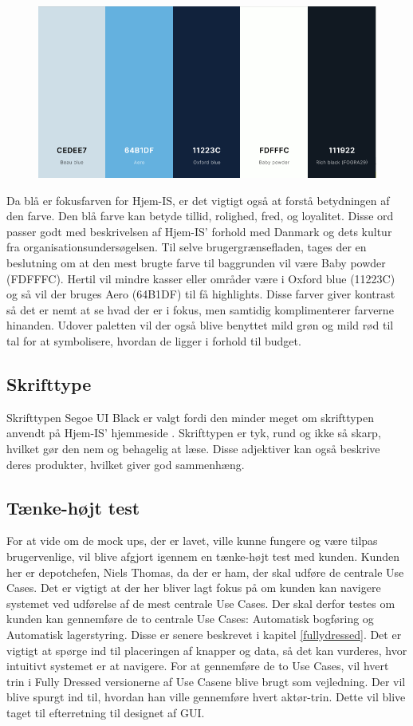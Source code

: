 \begin{figure}
    \centering
    \includegraphics[width=\textwidth]{figures/Preliminary/farvepalet.png}
    \label{fig:farvepalet}
\end{figure}
Da blå er fokusfarven for Hjem-IS, er det vigtigt også at forstå betydningen af den farve. Den blå farve kan betyde tillid, rolighed, fred, og loyalitet. Disse ord passer godt med beskrivelsen af Hjem-IS' forhold med Danmark og dets kultur fra organisationsundersøgelsen. Til selve brugergrænsefladen, tages der en beslutning om at den mest brugte farve til baggrunden vil være Baby powder (FDFFFC). Hertil vil mindre kasser eller områder være i Oxford blue (11223C) og så vil der bruges Aero (64B1DF) til få highlights. Disse farver giver kontrast så det er nemt at se hvad der er i fokus, men samtidig komplimenterer farverne hinanden. Udover paletten vil der også blive benyttet mild grøn og mild rød til tal for at symbolisere, hvordan de ligger i forhold til budget.

\subsection{Skrifttype}
Skrifttypen Segoe UI Black er valgt fordi den minder meget om skrifttypen anvendt på Hjem-IS' hjemmeside \cite{hjemis}. Skrifttypen er tyk, rund og ikke så skarp, hvilket gør den nem og behagelig at læse. Disse adjektiver kan også beskrive deres produkter, hvilket giver god sammenhæng.

\subsection{Tænke-højt test}
For at vide om de mock ups, der er lavet, ville kunne fungere og være tilpas brugervenlige, vil blive afgjort igennem en tænke-højt test med kunden. Kunden her er depotchefen, Niels Thomas, da der er ham, der skal udføre de centrale Use Cases. Det er vigtigt at der her bliver lagt fokus på om kunden kan navigere systemet ved udførelse af de mest centrale Use Cases. Der skal derfor testes om kunden kan gennemføre de to centrale Use Cases: Automatisk bogføring og Automatisk lagerstyring. Disse er senere beskrevet i kapitel \ref{fullydressed}. Det er vigtigt at spørge ind til placeringen af knapper og data, så det kan vurderes, hvor intuitivt systemet er at navigere. For at gennemføre de to Use Cases, vil hvert trin i Fully Dressed versionerne af Use Casene blive brugt som vejledning. Der vil blive spurgt ind til, hvordan han ville gennemføre hvert aktør-trin. Dette vil blive taget til efterretning til designet af GUI.

